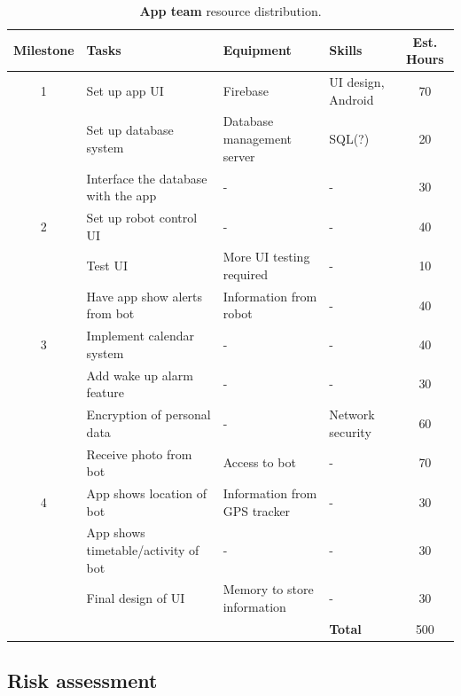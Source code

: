 \documentclass{article}
\begin{document}
\begin{table}[]
  \begin{center}
  \begin{small}
  \begin{tabular}{|c|l|l|l|c|}
    \hline
    {\bf Milestone} & {\bf Tasks} & {\bf Equipment} & {\bf Skills} & {\bf Est. Hours} \\ \hline
    1               & Set up app UI & Firebase & UI design, Android & 70 \\ \cline{2-5}
                    & Set up database system & Database management server & SQL(?) & 20 \\ \cline{2-5}
                    & Interface the database with the app & - & - & 30 \\ \hline
    2               & Set up robot control UI & - & - & 40 \\ \cline{2-5}
                    & Test UI & More UI testing required & - & 10 \\ \cline{2-5}
                    & Have app show alerts from bot & Information from robot & - & 40 \\ \hline
    3               & Implement calendar system & - & - & 40 \\ \cline{2-5}
                    & Add wake up alarm feature & - & - & 30 \\ \cline{2-5}
                    & Encryption of personal data & - & Network security & 60 \\ \cline{2-5}
                    & Receive photo from bot & Access to bot & - & 70 \\ \hline
    4               & App shows location of bot & Information from GPS tracker & - & 30 \\ \cline{2-5}
                    & App shows timetable/activity of bot & - & - & 30 \\ \cline{2-5}
                    & Final design of UI & Memory to store information & - & 30 \\ \hline
                    &                           &  & {\bf Total} & 500 \\ \hline
  \end{tabular}
  \end{small}
  \caption{{\bf App team} resource distribution.}
  \end{center}
\end{table}


\subsection{Risk assessment} 
\end{document}
